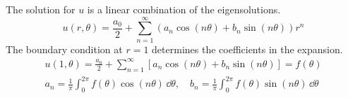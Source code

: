 {\begin{Solution}
  The solution for $u$ is a linear combination of the eigensolutions.
  \[
  u(r,\theta) = \frac{a_0}{2} + \sum_{n=1}^\infty \left( a_n \cos(n\theta) +
    b_n \sin(n\theta) \right) r^n
  \]
  The boundary condition at $r = 1$ determines the coefficients in the 
  expansion.
  \begin{gather*}
    u(1,\theta) = \frac{a_0}{2} + \sum_{n=1}^\infty \left[ a_n \cos(n\theta) +
      b_n \sin(n\theta) \right] = f(\theta)
    \\
    a_n = \frac{1}{\pi} \int_0^{2\pi} f(\theta) \cos(n \theta) \,\dd \theta, \quad
    b_n = \frac{1}{\pi} \int_0^{2\pi} f(\theta) \sin(n \theta) \,\dd \theta
  \end{gather*}
\end{Solution}












}

